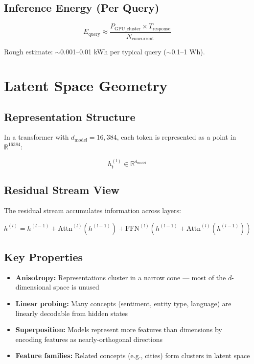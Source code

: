 \documentclass[11pt,a4paper]{article}
\begin{document}
\subsection{Inference Energy (Per Query)}

$$E_{\text{query}} \approx \frac{P_{\text{GPU\_cluster}} \times T_{\text{response}}}{N_{\text{concurrent}}}$$

Rough estimate: $\sim$0.001--0.01 kWh per typical query ($\sim$0.1--1 Wh).

\section{Latent Space Geometry}

\subsection{Representation Structure}

In a transformer with $d_{\text{model}} = 16{,}384$, each token is represented as a point in $\mathbb{R}^{16384}$:

$$h_t^{(l)} \in \mathbb{R}^{d_{\text{model}}}$$

\subsection{Residual Stream View}

The residual stream accumulates information across layers:

$$h^{(l)} = h^{(l-1)} + \text{Attn}^{(l)}(h^{(l-1)}) + \text{FFN}^{(l)}(h^{(l-1)} + \text{Attn}^{(l)}(h^{(l-1)}))$$

\subsection{Key Properties}

\begin{itemize}[itemsep=1pt]
  \item \textbf{Anisotropy:} Representations cluster in a narrow cone --- most of the $d$-dimensional space is unused
  \item \textbf{Linear probing:} Many concepts (sentiment, entity type, language) are linearly decodable from hidden states
  \item \textbf{Superposition:} Models represent more features than dimensions by encoding features as nearly-orthogonal directions
  \item \textbf{Feature families:} Related concepts (e.g., cities) form clusters in latent space
\end{itemize}
\end{document}
